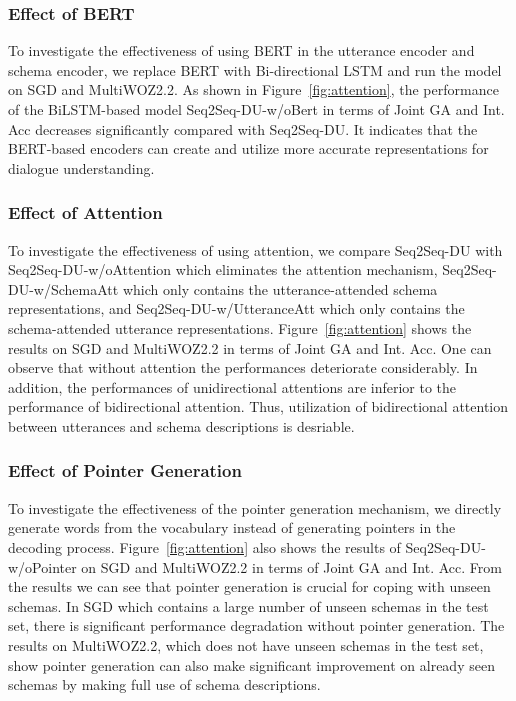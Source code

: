 \documentclass[11pt]{article}
\begin{document}
\subsubsection*{Effect of BERT}
To investigate the effectiveness of using BERT in the utterance encoder and schema encoder, we replace BERT with Bi-directional LSTM and run the model on SGD and MultiWOZ2.2. As shown in Figure~\ref{fig:attention}, the performance of the BiLSTM-based model Seq2Seq-DU-w/oBert in terms of Joint GA and Int. Acc decreases significantly compared with Seq2Seq-DU. It indicates that the BERT-based encoders can create and utilize more accurate representations for dialogue understanding.

\subsubsection*{Effect of Attention}
To investigate the effectiveness of using attention, we compare Seq2Seq-DU with Seq2Seq-DU-w/oAttention which eliminates the attention mechanism, Seq2Seq-DU-w/SchemaAtt which only contains the utterance-attended schema representations, and Seq2Seq-DU-w/UtteranceAtt which only contains the schema-attended utterance representations. Figure~\ref{fig:attention} shows the results on SGD and MultiWOZ2.2 in terms of Joint GA and Int. Acc.  One can observe that without attention the performances deteriorate considerably. In addition, the performances of unidirectional attentions are inferior to the performance of bidirectional attention. Thus, utilization of bidirectional attention between utterances and schema descriptions is desriable. 







\subsubsection*{Effect of Pointer Generation}
To investigate the effectiveness of the pointer generation mechanism, we directly generate words from the vocabulary instead of generating pointers in the decoding process. Figure~\ref{fig:attention} also shows the results of Seq2Seq-DU-w/oPointer on SGD and MultiWOZ2.2 in terms of Joint GA and Int. Acc. From the results we can see that pointer generation is crucial for coping with unseen schemas. In SGD which contains a large number of unseen schemas in the test set, there is significant performance degradation without pointer generation. The results on MultiWOZ2.2, which does not have unseen schemas in the test set, show pointer generation can also 
make significant improvement on already seen schemas by making full use of schema descriptions.
\end{document}
